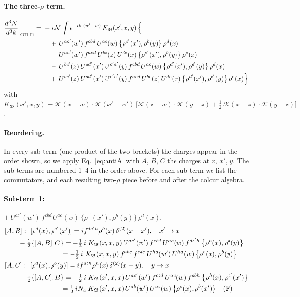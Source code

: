 \documentclass[10pt]{article}
\numberwithin{equation}{section}
\newcommand{\KK}{\mathcal K}
\newcommand{\NN}{\mathcal N}
\begin{document}
\paragraph{The three-$\rho$ term.}
\begin{align}
\frac{d^3N}{d^3k}\bigg|_{\rm GII.I1}={}&-i\,\NN\int e^{-ik\cdot(w'-w)}\,K_{\mathfrak B}(x',x,y)\,\Big\{\notag\\
&\quad +\,U^{ac'}(w')\,f^{cbd}\,U^{ac}(w)\,\big\{\rho^{c'}(x'),\rho^{b}(y)\big\}\,\rho^{d}(x)\notag\\
&\quad -\,U^{ac'}(w')\,f^{acd}\,U^{bc}(z)\,U^{de}(x)\,\big\{\rho^{c'}(x'),\rho^{b}(y)\big\}\,\rho^{e}(x)\notag\\
&\quad -\,U^{bc'}(z)\,U^{ad'}(x')\,U^{c'e'}(y)\,f^{cbd}\,U^{ac}(w)\,\big\{\rho^{d'}(x'),\rho^{e'}(y)\big\}\,\rho^{d}(x)\notag\\
&\quad +\,U^{bc'}(z)\,U^{ad'}(x')\,U^{c'e'}(y)\,f^{acd}\,U^{bc}(z)\,U^{de}(x)\,\big\{\rho^{d'}(x'),\rho^{e'}(y)\big\}\,\rho^{e}(x)\Big\}\label{eq:in-GII.I1}
\end{align}
with $K_{\mathfrak B}(x',x,y)=\KK(x-w)\cdot\KK(x'-w')\,\Big[\KK(z-w)\cdot\KK(y-z)+\tfrac12\,\KK(x-z)\cdot\KK(y-z)\Big]$.
\paragraph{Reordering.} In every sub-term (one product of the two brackets) the charges appear in the order shown, so we apply Eq.~\eqref{eq:antiA} with $A$, $B$, $C$ the charges at $x$, $x'$, $y$. The sub-terms are numbered 1--4 in the order above. For each sub-term we list the commutators, and each resulting two-$\rho$ piece before and after the colour algebra.
\paragraph{Sub-term 1:} $+\,U^{ac'}(w')\,f^{cbd}\,U^{ac}(w)\,\big\{\rho^{c'}(x'),\rho^{b}(y)\big\}\,\rho^{d}(x)$.
\begin{align}
&[A,B]:\ [\rho^{d}(x),\rho^{c'}(x')]=i f^{dc'h}\rho^{h}(x)\,\delta^{(2)}(x-x'),\quad x'\to x\notag\\
&\qquad -\tfrac12\{[A,B],C\}=-\tfrac12\,i\,\,K_{\mathfrak B}(x,x,y)\,U^{ac'}(w')\,f^{cbd}\,U^{ac}(w)\,f^{dc'h}\,\big\{\rho^{h}(x),\rho^{b}(y)\big\}\notag\\
&\qquad\phantom{-\tfrac12\{[A,B],C\}}=-\tfrac12\,i\,\,K_{\mathfrak B}(x,x,y)\,f^{abc}\,f^{cde}\,U^{hd}(w')\,U^{ha}(w)\,\big\{\rho^{e}(x),\rho^{b}(y)\big\}
\label{eq:GII.I1-1-AB}\\
&[A,C]:\ [\rho^{d}(x),\rho^{b}(y)]=i f^{dbh}\rho^{h}(x)\,\delta^{(2)}(x-y),\quad y\to x\notag\\
&\qquad -\tfrac12\{[A,C],B\}=-\tfrac12\,i\,\,K_{\mathfrak B}(x',x,x)\,U^{ac'}(w')\,f^{cbd}\,U^{ac}(w)\,f^{dbh}\,\big\{\rho^{h}(x),\rho^{c'}(x')\big\}\notag\\
&\qquad\phantom{-\tfrac12\{[A,C],B\}}=\tfrac12\,i N_{c}\,\,K_{\mathfrak B}(x',x,x)\,U^{ab}(w')\,U^{ac}(w)\,\big\{\rho^{c}(x),\rho^{b}(x')\big\}\quad\text{(F)}
\label{eq:GII.I1-1-AC}
\end{align}
\end{document}
